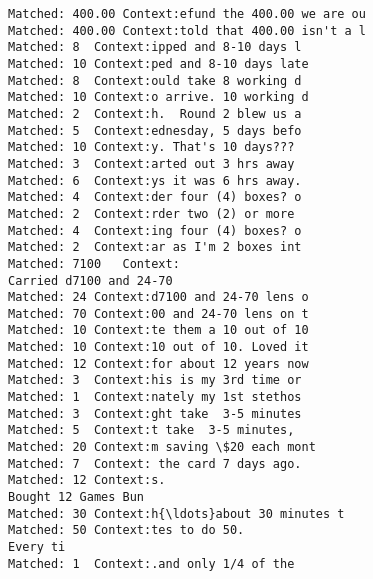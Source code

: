 \documentclass[11pt]{article}
\begin{document}
    \begin{Verbatim}[commandchars=\\\{\}]
Matched: 400.00	Context:efund the 400.00 we are ou
Matched: 400.00	Context:told that 400.00 isn't a l
Matched: 8	Context:ipped and 8-10 days l
Matched: 10	Context:ped and 8-10 days late
Matched: 8	Context:ould take 8 working d
Matched: 10	Context:o arrive. 10 working d
Matched: 2	Context:h.  Round 2 blew us a
Matched: 5	Context:ednesday, 5 days befo
Matched: 10	Context:y. That's 10 days???  
Matched: 3	Context:arted out 3 hrs away 
Matched: 6	Context:ys it was 6 hrs away.
Matched: 4	Context:der four (4) boxes? o
Matched: 2	Context:rder two (2) or more 
Matched: 4	Context:ing four (4) boxes? o
Matched: 2	Context:ar as I'm 2 boxes int
Matched: 7100	Context:
Carried d7100 and 24-70
Matched: 24	Context:d7100 and 24-70 lens o
Matched: 70	Context:00 and 24-70 lens on t
Matched: 10	Context:te them a 10 out of 10
Matched: 10	Context:10 out of 10. Loved it
Matched: 12	Context:for about 12 years now
Matched: 3	Context:his is my 3rd time or
Matched: 1	Context:nately my 1st stethos
Matched: 3	Context:ght take  3-5 minutes
Matched: 5	Context:t take  3-5 minutes, 
Matched: 20	Context:m saving \$20 each mont
Matched: 7	Context: the card 7 days ago.
Matched: 12	Context:s.
Bought 12 Games Bun
Matched: 30	Context:h{\ldots}about 30 minutes t
Matched: 50	Context:tes to do 50.
Every ti
Matched: 1	Context:.and only 1/4 of the 

\end{Verbatim}
\end{document}
